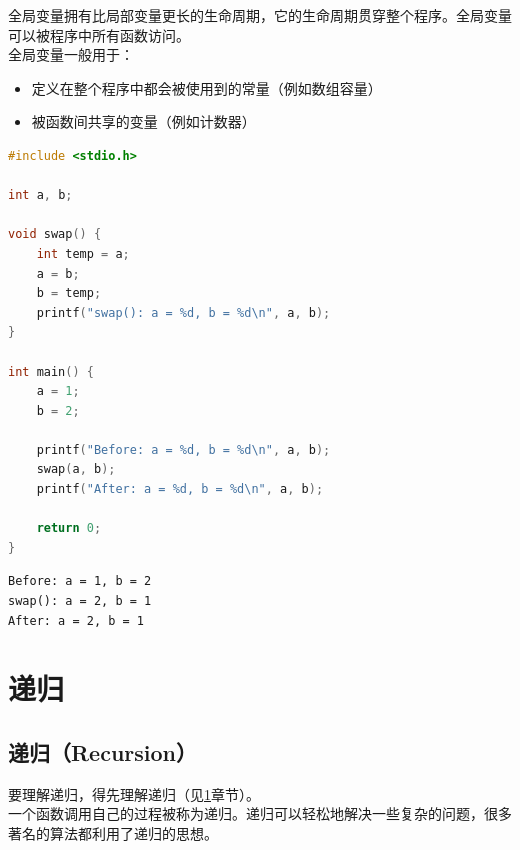 全局变量拥有比局部变量更长的生命周期，它的生命周期贯穿整个程序。全局变量可以被程序中所有函数访问。\\

全局变量一般用于：

\begin{itemize}
	\item 定义在整个程序中都会被使用到的常量（例如数组容量）
	\item 被函数间共享的变量（例如计数器）
\end{itemize}

\vspace{0.5cm}


\begin{lstlisting}[language=C]
#include <stdio.h>

int a, b;

void swap() {
	int temp = a;
	a = b;
	b = temp;
	printf("swap(): a = %d, b = %d\n", a, b);
}

int main() {
	a = 1;
	b = 2;

	printf("Before: a = %d, b = %d\n", a, b);
	swap(a, b);
	printf("After: a = %d, b = %d\n", a, b);

	return 0;
}
\end{lstlisting}

\begin{tcolorbox}
	\begin{verbatim}
Before: a = 1, b = 2
swap(): a = 2, b = 1
After: a = 2, b = 1
	\end{verbatim}
\end{tcolorbox}

\newpage

\section{递归} \label{recursion}

\subsection{递归（Recursion）}

要理解递归，得先理解递归（见\ref{recursion}章节）。\\

一个函数调用自己的过程被称为递归。递归可以轻松地解决一些复杂的问题，很多著名的算法都利用了递归的思想。

